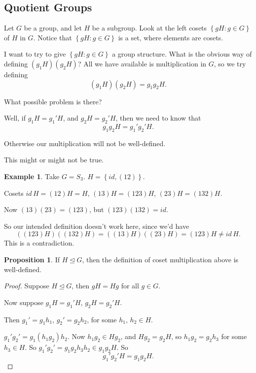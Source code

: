 \documentclass{article}
\theoremstyle{definition} \newtheorem*{definition}{Definition}
\newtheorem{proposition}[theorem]{Proposition}
\newtheorem*{exmp}{Example} \newtheorem*{exmps}{Examples}
\begin{document}
\subsection{Quotient Groups} Let $G$ be a group, and let $H$ be a subgroup. Look
at the left cosets $\left\{ gH:g\in G \right\}$ of $H$ in $G$. Notice that
$\left\{ gH:g\in G \right\}$ is a set, where elements are cosets.

I want to try to give $\left\{ gH:g\in G \right\}$ a group structure. What is
the obvious way of defining $(g_1 H)(g_2 H)$? All we have available is
multiplication in $G$, so we try defining \[ (g_1 H )(g_2 H) = g_1 g_2 H.  \]

What possible problem is there? 

Well, if $g_1 H=g_1'H$, and $g_2 H=g_2' H$, then we need to know that \[ g_1g_2
H = g_1' g_2' H.  \]

Otherwise our multiplication will not be well-defined.

This might or might not be true.\\

\begin{exmp} Take $G = S_3$. $H = \left\{ id, (12) \right\}$.

  Cosets $id\, H=(12)H=H$, $(13)H=(123)H$, $(23)H=(132)H$.

  Now $(13)(23)=(123)$, but $(123)(132)=id$.

  So our intended definition doesn't work here, since we'd have \[
  ((123)H)((132)H)=((13)H)(\left( 23 \right)H)=(123)H \neq id\,H.  \] This is a
  contradiction.\\ \end{exmp}

\begin{proposition} If $H \trianglelefteq G$, then the definition of coset
  multiplication above is well-defined.  \end{proposition}

\begin{proof} Suppose $H \trianglelefteq G$, then $gH=Hg$ for all $g \in G$.

  Now suppose $g_1H=g_1'H$, $g_2H=g_2'H$.

  Then $g_1' = g_1h_1$, $g_2'=g_2h_2$, for some $h_1,\,h_2 \in H$.

  $g_1'g_2'=g_1(h_1g_2)h_2$. Now $h_1g_2 \in Hg_2$, and $Hg_2=g_2H$, so
  $h_1g_2=g_2h_3$ for some $h_3 \in H$. So $g_1'g_2'=g_1g_2h_3h_2 \in g_1g_2H$.
  So \[ g_1'g_2'H = g_1g_2H.  \] \end{proof}
\end{document}
